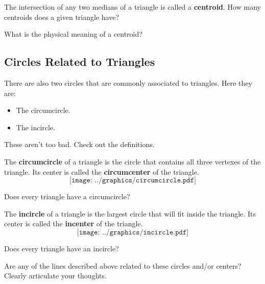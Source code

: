 \begin{question} 
The intersection of any two medians of a triangle is called a
\textbf{centroid}. How many centroids does a given
triangle have?
\end{question}
\QM


\begin{question} What is the physical meaning of a centroid?
\end{question}
\QM




\subsection{Circles Related to Triangles}


There are also two circles that are commonly associated to
triangles. Here they are:
\begin{itemize}
\item The circumcircle.
\item The incircle.
\end{itemize}

These aren't too bad. Check out the definitions.

\begin{definition}
The \textbf{circumcircle} of a triangle is the circle that contains
all three vertexes of the triangle. Its center is called the
\textbf{circumcenter} of the triangle.
\[
\texttt{[image: ../graphics/circumcircle.pdf]}
\]
\end{definition}

\begin{question} Does every triangle have a circumcircle?
\end{question}
\QM

\begin{definition}
The \textbf{incircle} of a triangle is the largest circle that will
fit inside the triangle. Its center is called the \textbf{incenter} of
the triangle.
\[
\texttt{[image: ../graphics/incircle.pdf]}
\]
\end{definition}


\begin{question} Does every triangle have an incircle?
\end{question}
\QM


\begin{question} 
Are any of the lines described above related to these circles and/or
centers? Clearly articulate your thoughts.
\end{question}
\QM


